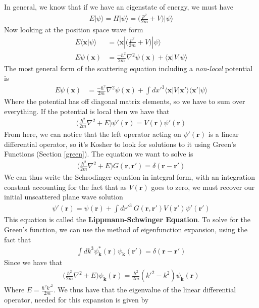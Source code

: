 In general, we know that if we have an eigenstate of energy, we must have
\begin{align}
    E|\psi\rangle = H|\psi\rangle = \Big(\frac{p^2}{2m} + V\Big)|\psi\rangle
\end{align}
Now looking at the position space wave form
\begin{align}
    E\langle \textbf{x} |\psi\rangle &=  \langle \textbf{x}|\Big(\frac{p^2}{2m} + V\Big)|\psi\rangle\\
    E\psi(\textbf{x}) &= \frac{-\hbar^2}{2m}\nabla^2\psi(\textbf{x}) + \langle\textbf{x}|V|\psi\rangle
\end{align}
The most general form of the scattering equation including a \emph{non-local} potential is
\begin{align}
    E\psi(\textbf{x}) &= \frac{-\hbar^2}{2m}\nabla^2\psi(\textbf{x}) + \int dx'^3\langle\textbf{x}|V|\textbf{x}'\rangle\langle\textbf{x}'|\psi\rangle
\end{align}
Where the potential has off diagonal matrix elements, so we have to sum over everything. If the potential is local then we have that
\begin{align}
\Big(\frac{\hbar^2}{2m}\nabla^2 + E\Big)\psi'(\textbf{r}) = V(\textbf{r})\psi'(\textbf{r})
\end{align}
From here, we can notice that the left operator acting on $\psi'(\textbf{r})$ is a linear differential operator, so it's Kosher to look for solutions to it using Green's Functions (Section \ref{green}). The equation we want to solve is
\begin{align}
\Big(\frac{\hbar^2}{2m}\nabla^2 + E\Big) G(\textbf{r}, \textbf{r}') = \delta(\textbf{r}-\textbf{r}')
\end{align}
We can thus write the Schrodinger equation in integral form, with an integration constant accounting for the fact that as $V(\textbf{r})$ goes to zero, we must recover our initial unscattered plane wave solution
\begin{align}\label{lippmann}
\psi'(\textbf{r}) = \psi(\textbf{r}) + \int dr'^3~G(\textbf{r}, \textbf{r}') V(\textbf{r}')\psi'(\textbf{r}')
\end{align}
This equation is called the \textbf{Lippmann-Schwinger Equation}. To solve for the Green's function, we can use the method of eigenfunction expansion\cite{milton}, using the fact that
\begin{align}
\int dk^3 \psi_\textbf{k}^*(\textbf{r})\psi_\textbf{k}(\textbf{r}') = \delta(\textbf{r}-\textbf{r}')
\end{align}
Since we have that
\begin{align}
\Big(\frac{\hbar^2}{2m}\nabla^2 + E\Big)\psi_\textbf{k}(\textbf{r}) = \frac{\hbar^2}{2m}(k'^2 - k^2)\psi_\textbf{k}(\textbf{r})
\end{align}
Where $E = \frac{\hbar^2k'^2}{2m}$. We thus have that the eigenvalue of the linear differential operator\cite{zangwill}, needed for this expansion is given by

